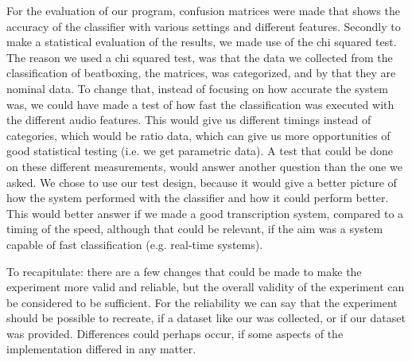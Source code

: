 
For the evaluation of our program, confusion matrices were made that shows the accuracy of the classifier with various settings and different features. Secondly to make a statistical evaluation of the results, we made use of the chi squared test. The reason we used a chi squared test, was that the data we collected from the classification of beatboxing, the matrices, was categorized, and by that they are nominal data. To change that, instead of focusing on how accurate the system was, we could have made a test of how fast the classification was executed with the different audio features. This would give us different timings instead of categories, which would be ratio data, which can give us more opportunities of good statistical testing (i.e. we get parametric data). A test that could be done on these different measurements, would answer another question than the one we asked. We chose to use our test design, because it would give a better picture of how the system performed with the classifier and how it could perform better. This would better answer if we made a good transcription system, compared to a timing of the speed, although that could be relevant, if the aim was a system capable of fast classification (e.g. real-time systems).


To recapitulate: there are a few changes that could be made to make the experiment more valid and reliable, but the overall validity of the experiment can be considered to be sufficient. For the reliability we can say that the experiment should be possible to recreate, if a dataset like our was collected, or if our dataset was provided. Differences could perhaps occur, if some aspects of the implementation differed in any matter.